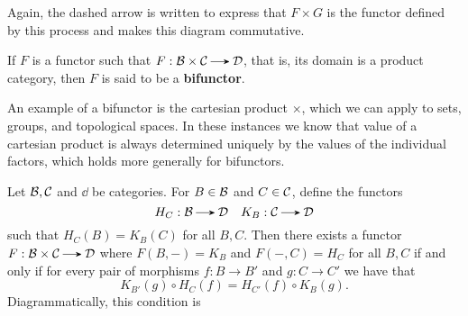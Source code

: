     \begin{center}
    \end{center}
    Again, the dashed arrow is written to express that $F \times G$ is
    the functor defined by this process and makes this diagram
    commutative.
    
    \begin{definition}
        If $F$ is a functor such that $F: \bb \times \cc \to \dd$,
        that is, its domain is a product category, then $F$ is said
        to be a \textbf{bifunctor}.
    \end{definition}

    An example of a bifunctor is the cartesian product $\times$, which
    we can apply to sets, groups, and topological spaces. In these
    instances we know that value of a cartesian product is always
    determined uniquely by the values of the individual factors, which
    holds more generally for bifunctors. 

    \begin{proposition}
        Let $\mathcal{B}, \mathcal{C}$ and $\dd$ be categories. For $B \in \mathcal{B}$ and $C
        \in \mathcal{C}$, define the functors
        \[
            H_C: \bb \to \dd \quad K_B: \cc \to \dd   
        \]
        such that $H_C(B) = K_B(C)$ for all $B, C$. Then there exists
        a functor $F:\bb \times \cc \to \dd$ where $F(B, -) = K_B$
        and $F(-, C) = H_C$ for all $B, C$ if and only if 
        for every pair of morphisms $f:B \to B'$ and
        $g:C\to C'$ we have that 
        \[
            K_{B'}(g) \circ H_C(f) = H_{C'}(f) \circ K_B(g).
        \]
        Diagrammatically, this condition is
        \begin{center}
        \end{center}
    \end{proposition}

